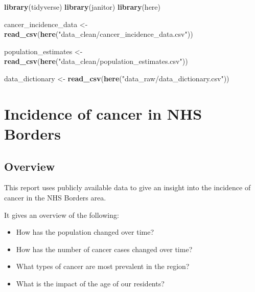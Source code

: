 \documentclass[
]{article}
\author{}
\date{\vspace{-2.5em}}
\newenvironment{Shaded}{\begin{snugshade}}{\end{snugshade}}
\newcommand{\KeywordTok}[1]{\textcolor[rgb]{0.13,0.29,0.53}{\textbf{#1}}}
\newcommand{\NormalTok}[1]{#1}
\newcommand{\StringTok}[1]{\textcolor[rgb]{0.31,0.60,0.02}{#1}}
\begin{document}
\begin{Shaded}
\begin{Highlighting}[]
\KeywordTok{library}\NormalTok{(tidyverse)}
\KeywordTok{library}\NormalTok{(janitor)}
\KeywordTok{library}\NormalTok{(here)}
\end{Highlighting}
\end{Shaded}

\begin{Shaded}
\begin{Highlighting}[]
\NormalTok{cancer_incidence_data <-}\StringTok{ }
\StringTok{ }\KeywordTok{read_csv}\NormalTok{(}\KeywordTok{here}\NormalTok{(}\StringTok{"data_clean/cancer_incidence_data.csv"}\NormalTok{))}

\NormalTok{population_estimates <-}\StringTok{ }
\StringTok{ }\KeywordTok{read_csv}\NormalTok{(}\KeywordTok{here}\NormalTok{(}\StringTok{"data_clean/population_estimates.csv"}\NormalTok{))}

\NormalTok{data_dictionary <-}\StringTok{ }\KeywordTok{read_csv}\NormalTok{(}\KeywordTok{here}\NormalTok{(}\StringTok{"data_raw/data_dictionary.csv"}\NormalTok{)) }
\end{Highlighting}
\end{Shaded}

\hypertarget{incidence-of-cancer-in-nhs-borders}{%
\section{\texorpdfstring{{Incidence of cancer in NHS
Borders}}{Incidence of cancer in NHS Borders}}\label{incidence-of-cancer-in-nhs-borders}}

\hypertarget{overview}{%
\subsection{\texorpdfstring{{Overview}}{Overview}}\label{overview}}

This report uses publicly available data to give an insight into the
incidence of cancer in the NHS Borders area.

It gives an overview of the following:

\begin{itemize}
\item
  How has the population changed over time?
\item
  How has the number of cancer cases changed over time?
\item
  What types of cancer are most prevalent in the region?
\item
  What is the impact of the age of our residents?
\end{itemize}
\end{document}
